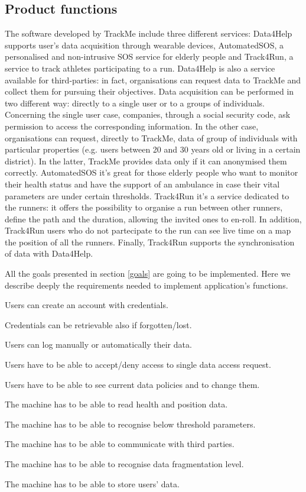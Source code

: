 \documentclass{article}
\begin{document}
\newpage

\subsection{Product functions}
The software developed by TrackMe include three different services:
Data4Help supports user's data acquisition through wearable devices, AutomatedSOS, a personalised and non-intrusive SOS 
service for elderly people and Track4Run, a service to track athletes 
participating to a run.
Data4Help is also a service available for third-parties: in fact, 
organisations can request data to TrackMe and collect them for 
pursuing their objectives.
Data acquisition can be performed in two different way: directly to a
single user or to a groups of individuals.
Concerning the single user case, companies, through a social security
code, ask permission to access the corresponding information. 
In the other case, organisations can request, directly to TrackMe,
data of group of individuals with particular properties (e.g. users 
between 20 and 30 years old or living in a certain district).
In the latter, TrackMe provides data only if it can anonymised them
correctly.
AutomatedSOS it’s great for those elderly people who want to monitor 
their health status and have the support of an ambulance in case their
vital parameters are under certain thresholds.
Track4Run it’s a service dedicated to the runners: it offers the 
possibility to organise a run between other runners, define the path 
and the duration, allowing the invited ones to en-roll. In addition, 
Track4Run users who do not partecipate to the run can see live time 
on a map the position of all the runners. 
Finally, Track4Run supports the synchronisation of data with 
Data4Help.

All the goals presented in section \ref{goals} are going to be 
implemented. Here we describe deeply the requirements needed to
implement application's functions.
	
\begin{enumerate}[label={[R\arabic*]}]
    	\item Users can create an account with credentials.
    	\item Credentials can be retrievable also if forgotten/lost.
    	\item Users can log manually or automatically their data.
    	\item Users have to be able to accept/deny access to single data access request.
    	\item Users have to be able to see current data policies and to change them.
    	\item The machine has to be able to read health and position data.
		\item The machine has to be able to recognise below threshold parameters.
		\item The machine has to be able to communicate with third parties.
		\item The machine has to be able to recognise data fragmentation level.
		\item The machine has to be able to store users’ data. 
\end{enumerate}
\newpage
\end{document}
